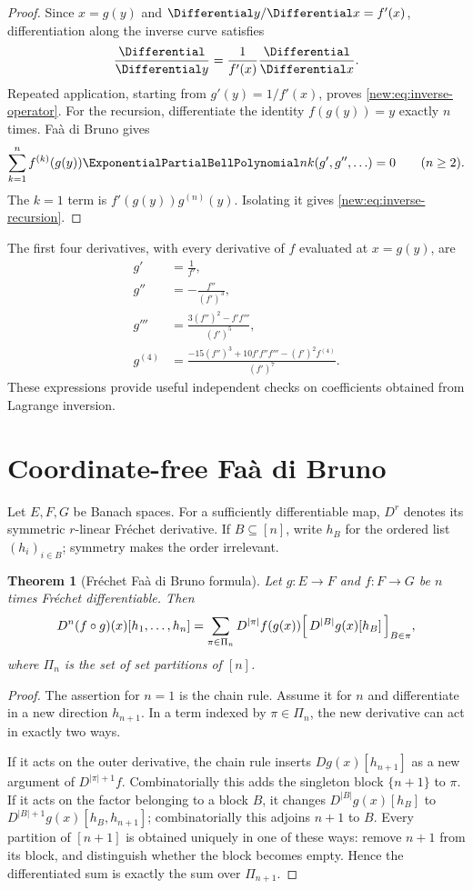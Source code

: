 \documentclass[11pt,a4paper,oneside,openany]{book}
\newtheorem{theorem}{Theorem}[chapter]
\theoremstyle{definition}
\theoremstyle{remark}
\begin{document}
\begin{proof}
Since $x=g(y)$ and $\Differential y/\Differential x=f'(x)$, differentiation along the inverse
curve satisfies
\[
 \frac{\Differential}{\Differential y}=\frac1{f'(x)}\frac{\Differential}{\Differential x}.
\]
Repeated application, starting from $g'(y)=1/f'(x)$, proves
\eqref{new:eq:inverse-operator}.  For the recursion, differentiate the identity
$f(g(y))=y$ exactly $n$ times.  Fa\`a di Bruno gives
\[
 \sum_{k=1}^n f^{(k)}(g(y))
 \ExponentialPartialBellPolynomial nk(g',g'',\ldots)=0
 \qquad(n\ge2).
\]
The $k=1$ term is $f'(g(y))g^{(n)}(y)$.  Isolating it gives
\eqref{new:eq:inverse-recursion}.
\end{proof}

The first four derivatives, with every derivative of $f$ evaluated at
$x=g(y)$, are
\begin{align*}
 g'&=\frac1{f'},\\
 g''&=-\frac{f''}{(f')^3},\\
 g'''&=\frac{3(f'')^2-f'f'''}{(f')^5},\\
 g^{(4)}&=\frac{-15(f'')^3+10f'f''f'''-(f')^2f^{(4)}}{(f')^7}.
\end{align*}
These expressions provide useful independent checks on coefficients obtained
from Lagrange inversion.

\section{Coordinate-free Fa\`a di Bruno}

Let $E,F,G$ be Banach spaces.  For a sufficiently differentiable map, $D^r$
denotes its symmetric $r$-linear Fr\'echet derivative.  If $B\subseteq[n]$,
write $h_B$ for the ordered list $(h_i)_{i\in B}$; symmetry makes the order
irrelevant.

\begin{theorem}[Fr\'echet Fa\`a di Bruno formula]
Let $g:E\to F$ and $f:F\to G$ be $n$ times Fr\'echet differentiable.  Then
\begin{equation}
 D^n(f\circ g)(x)[h_1,\ldots,h_n]
 =\sum_{\pi\in\Pi_n}
 D^{|\pi|}f(g(x))
 \Bigl[\,D^{|B|}g(x)[h_B] \,\Bigr]_{B\in\pi},
 \label{new:eq:frechet-faa}
\end{equation}
where $\Pi_n$ is the set of set partitions of $[n]$.
\end{theorem}

\begin{proof}
The assertion for $n=1$ is the chain rule.  Assume it for $n$ and differentiate
in a new direction $h_{n+1}$.  In a term indexed by $\pi\in\Pi_n$, the new
derivative can act in exactly two ways.

If it acts on the outer derivative, the chain rule inserts
$Dg(x)[h_{n+1}]$ as a new argument of $D^{|\pi|+1}f$.  Combinatorially this adds
the singleton block $\{n+1\}$ to $\pi$.  If it acts on the factor belonging to
a block $B$, it changes
$D^{|B|}g(x)[h_B]$ to
$D^{|B|+1}g(x)[h_B,h_{n+1}]$; combinatorially this adjoins $n+1$ to $B$.
Every partition of $[n+1]$ is obtained uniquely in one of these ways: remove
$n+1$ from its block, and distinguish whether the block becomes empty.  Hence
the differentiated sum is exactly the sum over $\Pi_{n+1}$.
\end{proof}
\end{document}
